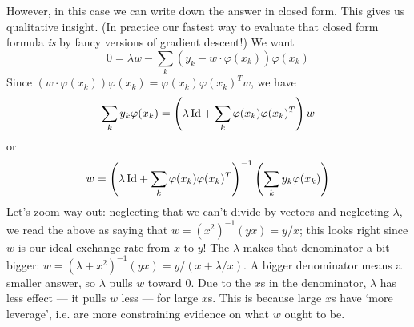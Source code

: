   However, in this case we can write down the answer in closed form.  This gives us qualitative insight.
  (In
  practice our fastest way to evaluate that closed form formula \emph{is} by
  fancy versions of gradient descent!)
  We want
  $$
    0 = \lambda w - \sum_k (y_k - w\cdot \varphi(x_k)) \varphi(x_k)
  $$
  Since $(w\cdot \varphi(x_k)) \varphi(x_k) = \varphi(x_k) \varphi(x_k)^T w$, we have
  $$
    \sum_k y_k \varphi(x_k) = \left(\lambda \, \text{Id} + \sum_k \varphi(x_k) \varphi(x_k)^T\right) w
  $$
  or
  $$
    w = \left(\lambda \, \text{Id} + \sum_k \varphi(x_k) \varphi(x_k)^T\right)^{-1} \left(\sum_k y_k \varphi(x_k)\right)
  $$
  Let's zoom way out: neglecting that we can't divide by vectors and neglecting
  $\lambda$, we read the above as saying that $w = (x^2)^{-1}(yx) = y/x$; this
  looks right since $w$ is our ideal exchange rate from $x$ to $y$!  The $\lambda$
  makes that denominator a bit bigger: $w = (\lambda + x^2)^{-1}(yx) = y/(x+\lambda/x)$.
  A bigger denominator means a smaller answer, so $\lambda$ pulls $w$ toward
  $0$.  Due to the $x$s in the denominator, $\lambda$ has less effect --- it pulls $w$ less ---
  for large $x$s.  This is because large $x$s have `more leverage', i.e. are
  more constraining evidence on what $w$ ought to be.

